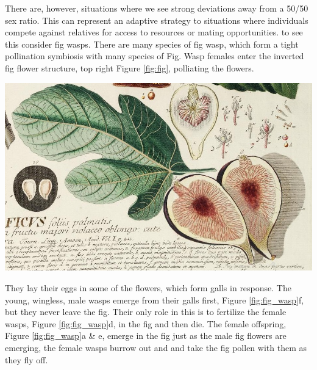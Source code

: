 {There are, however, situations where we see strong deviations away
from a 50/50 sex ratio. This can represent an adaptive strategy to
situations where individuals compete against relatives for access to resources or
mating opportunities. to see this consider fig wasps. There are many
species of fig wasp, which form a tight pollination symbiosis with many species of 
Fig. Wasp females enter the inverted fig flower structure, top right
Figure \ref{fig:fig}, polliating the flowers. \begin{marginfigure}
  \begin{center}
    \includegraphics[width=
    \textwidth]{illustration_images/single_locus_selection/Fig_wasp/cropped_fig.png}  %
\end{center}  %
\caption{ %
Common Fig ({\it Ficus carica}). Despite urban legends the crunch in
figs isn't dead wasps, edible figs are dioecious and female wasps
can't lay in the female flowers that form the fruit we eat. 
} \label{fig:fig}
\end{marginfigure}
 They lay their eggs in some of the
flowers, which form galls in response.  The young, wingless, male
wasps emerge from their galls first, Figure \ref{fig:fig_wasp}f, but
they never leave the fig. Their only role in this is
to fertilize the female wasps, Figure \ref{fig:fig_wasp}d, in the fig and then die. The female
offspring, Figure \ref{fig:fig_wasp}a \& e, emerge in the fig just as the male fig flowers
are emerging, the female wasps burrow out and and take the fig pollen with them as they fly off.

}
